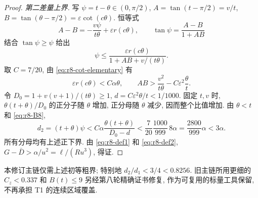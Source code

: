 \begin{proof}
\emph{第二差量上界.} 写 $\psi=t-\theta\in(0,\pi/2)$,
$A=\tan(t-\pi/2)=v/t$, $B=\tan(\theta-\pi/2)=\varepsilon\cot(c\theta)$.
恒等式
\[
 A-B=-\frac{v\psi}{t\theta}+\varepsilon r(c\theta),\qquad
 \tan\psi=\frac{A-B}{1+AB}
\]
结合 $\tan\psi\ge\psi$ 给出
\[
 \psi\le\frac{\varepsilon r(c\theta)}{1+AB+v/(t\theta)}.
\]
取 $C=7/20$, 由 \eqref{eq:r8-cot-elementary} 有
\[
 \varepsilon r(c\theta)<C\alpha\theta,\qquad
 AB>\frac{v^2}{t\theta}-C\varepsilon^2\frac\theta t.
\]
令 $D_0=1+v(v+1)/(t\theta)\ge1$, $d=C\varepsilon^2\theta/t<1/1000$.
固定 $t,v$ 时, $\theta(t+\theta)/D_0$ 的正分子随 $\theta$ 增加,
正分母随 $\theta$ 减少, 因而整个比值增加. 由 $\theta<t$ 和 \eqref{eq:r8-B8},
\begin{equation}
 d_2=(t+\theta)\psi
 < C\alpha\frac{\theta(t+\theta)}{D_0-d}
 <\frac7{20}\frac{1000}{999}\,8\alpha
 =\frac{2800}{999}\alpha<3\alpha.\label{eq:r8-def2}
\end{equation}
所有分母均有上述正下界. 由 \eqref{eq:r8-def1} 和 \eqref{eq:r8-def2},
$G-\bar D>\alpha/u^2=\ell/(Ru^3)$, 得证.
\end{proof}

本修订主链仅需上述初等粗界; 特别地 $d_2/d_1<3/4<0.8256$.
旧主链所用更细的 $C_z<0.337$ 和 $B(t)\le9$ 另经第八轮精确证书修复,
作为可复用的标量工具保留, 不再承担 T1 的连续区域覆盖.
